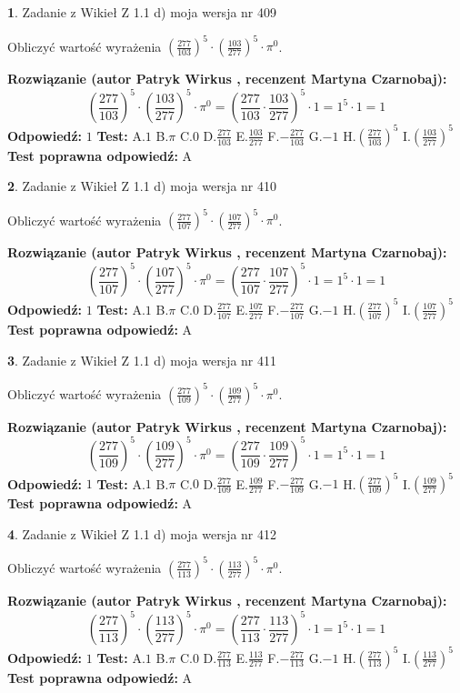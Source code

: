 \documentclass[12pt, a4paper]{article}
\theoremstyle{definition} %
\newtheorem{zad}{}
\newcommand{\zadStart}[1]{\begin{zad}#1\newline}
\newcommand{\zadStop}{\end{zad}}
\newcommand{\rozwStart}[2]{\noindent \textbf{Rozwiązanie (autor #1 , recenzent #2): }\newline}
\newcommand{\rozwStop}{\newline}
\newcommand{\odpStart}{\noindent \textbf{Odpowiedź:}\newline}
\newcommand{\odpStop}{\newline}
\newcommand{\testStart}{\noindent \textbf{Test:}\newline}
\newcommand{\testStop}{\newline}
\newcommand{\kluczStart}{\noindent \textbf{Test poprawna odpowiedź:}\newline}
\newcommand{\kluczStop}{\newline}
\begin{document}
\zadStart{Zadanie z Wikieł Z 1.1 d) moja wersja nr 409}

Obliczyć wartość wyrażenia $(\frac{277}{103})^{5} \cdot (\frac{103}{277})^{5} \cdot \pi^{0}$.
\zadStop
\rozwStart{Patryk Wirkus}{Martyna Czarnobaj}
$$(\frac{277}{103})^{5} \cdot (\frac{103}{277})^{5} \cdot \pi^{0} = (\frac{277}{103} \cdot \frac{103}{277})^{5} \cdot 1 = 1^{5} \cdot 1 = 1$$
\rozwStop
\odpStart
$1$
\odpStop
\testStart
A.$1$ B.$\pi$ C.$0$ D.$\frac{277}{103}$ E.$\frac{103}{277}$
F.$-\frac{277}{103}$ G.$-1$
H.$(\frac{277}{103})^{5}$
I.$(\frac{103}{277})^{5}$
\testStop
\kluczStart
A
\kluczStop



\zadStart{Zadanie z Wikieł Z 1.1 d) moja wersja nr 410}

Obliczyć wartość wyrażenia $(\frac{277}{107})^{5} \cdot (\frac{107}{277})^{5} \cdot \pi^{0}$.
\zadStop
\rozwStart{Patryk Wirkus}{Martyna Czarnobaj}
$$(\frac{277}{107})^{5} \cdot (\frac{107}{277})^{5} \cdot \pi^{0} = (\frac{277}{107} \cdot \frac{107}{277})^{5} \cdot 1 = 1^{5} \cdot 1 = 1$$
\rozwStop
\odpStart
$1$
\odpStop
\testStart
A.$1$ B.$\pi$ C.$0$ D.$\frac{277}{107}$ E.$\frac{107}{277}$
F.$-\frac{277}{107}$ G.$-1$
H.$(\frac{277}{107})^{5}$
I.$(\frac{107}{277})^{5}$
\testStop
\kluczStart
A
\kluczStop



\zadStart{Zadanie z Wikieł Z 1.1 d) moja wersja nr 411}

Obliczyć wartość wyrażenia $(\frac{277}{109})^{5} \cdot (\frac{109}{277})^{5} \cdot \pi^{0}$.
\zadStop
\rozwStart{Patryk Wirkus}{Martyna Czarnobaj}
$$(\frac{277}{109})^{5} \cdot (\frac{109}{277})^{5} \cdot \pi^{0} = (\frac{277}{109} \cdot \frac{109}{277})^{5} \cdot 1 = 1^{5} \cdot 1 = 1$$
\rozwStop
\odpStart
$1$
\odpStop
\testStart
A.$1$ B.$\pi$ C.$0$ D.$\frac{277}{109}$ E.$\frac{109}{277}$
F.$-\frac{277}{109}$ G.$-1$
H.$(\frac{277}{109})^{5}$
I.$(\frac{109}{277})^{5}$
\testStop
\kluczStart
A
\kluczStop



\zadStart{Zadanie z Wikieł Z 1.1 d) moja wersja nr 412}

Obliczyć wartość wyrażenia $(\frac{277}{113})^{5} \cdot (\frac{113}{277})^{5} \cdot \pi^{0}$.
\zadStop
\rozwStart{Patryk Wirkus}{Martyna Czarnobaj}
$$(\frac{277}{113})^{5} \cdot (\frac{113}{277})^{5} \cdot \pi^{0} = (\frac{277}{113} \cdot \frac{113}{277})^{5} \cdot 1 = 1^{5} \cdot 1 = 1$$
\rozwStop
\odpStart
$1$
\odpStop
\testStart
A.$1$ B.$\pi$ C.$0$ D.$\frac{277}{113}$ E.$\frac{113}{277}$
F.$-\frac{277}{113}$ G.$-1$
H.$(\frac{277}{113})^{5}$
I.$(\frac{113}{277})^{5}$
\testStop
\kluczStart
A
\kluczStop
\end{document}
